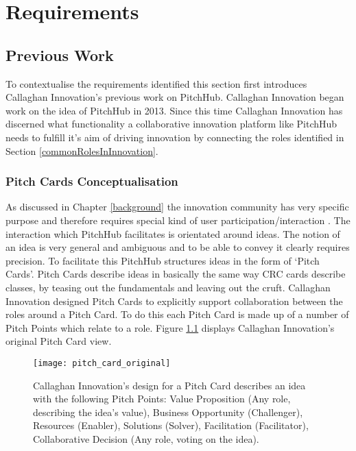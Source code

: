 \chapter{Requirements}

\section{Previous Work}

To contextualise the requirements identified this section first introduces Callaghan Innovation's previous work on PitchHub. Callaghan Innovation began work on the idea of PitchHub in 2013. Since this time Callaghan Innovation has discerned what functionality a collaborative innovation platform like PitchHub needs to fulfill it's aim of driving innovation by connecting the roles identified in Section \ref{commonRolesInInnovation}.

\subsection{Pitch Cards Conceptualisation}
As discussed in Chapter \ref{background} the innovation community has very specific purpose and therefore requires special kind of user participation/interaction \cite{hautz2010establish}. The interaction which PitchHub facilitates is orientated around ideas. The notion of an idea is very general and ambiguous and to be able to convey it clearly requires precision. To facilitate this PitchHub structures ideas in the form of `Pitch Cards'. Pitch Cards describe ideas in basically the same way CRC cards describe classes, by teasing out the fundamentals and leaving out the cruft. Callaghan Innovation designed Pitch Cards to explicitly support collaboration between the roles around a Pitch Card. To do this each Pitch Card is made up of a number of Pitch Points which relate to a role. Figure \ref{fig:pitch_card_original} displays Callaghan Innovation's original Pitch Card view.
\begin{figure}[ht]
    \centering
    \texttt{[image: pitch\_card\_original]}
    \caption{Callaghan Innovation's design for a Pitch Card describes an idea with the following Pitch Points: Value Proposition (Any role, describing the idea's value), Business Opportunity (Challenger), Resources (Enabler), Solutions (Solver), Facilitation (Facilitator), Collaborative Decision (Any role, voting on the idea).}
    \label{fig:pitch_card_original}
\end{figure}


